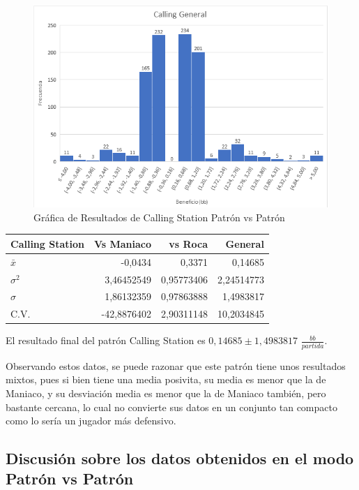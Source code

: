 \begin{figure}[h]
\centering
\includegraphics[width=1\textwidth]{figuras/CG.png}   
\caption{Gráfica de Resultados de Calling Station Patrón vs Patrón}
\label{fig:CGR}
\end{figure}

\begin{longtable}[c]{lrrr}
\hline
Calling Station & Vs Maniaco & vs Roca & General \\ \hline
$\bar{x}$ & -0,0434 & 0,3371 & 0,14685 \\ 
$\sigma^2$ & 3,46452549 & 0,95773406 & 2,24514773 \\ 
$\sigma$ & 1,86132359 & 0,97863888 & 1,4983817 \\ 
C.V. & -42,8876402 & 2,90311148 & 10,2034845 \\ \hline
\end{longtable}


El resultado final del patrón Calling Station es $ 0,14685\pm1,4983817$  $\frac{bb}{partida}$.

\smallskip

Observando estos datos, se puede razonar que este patrón tiene unos resultados mixtos, pues si bien tiene una media posivita, su media es menor que la de Maniaco, y su desviación media es menor que la de Maniaco también, pero bastante cercana, lo cual no convierte sus datos en un conjunto tan compacto como lo sería un jugador más defensivo.

\clearpage

\subsection{Discusión sobre los datos obtenidos en el modo Patrón vs Patrón}

